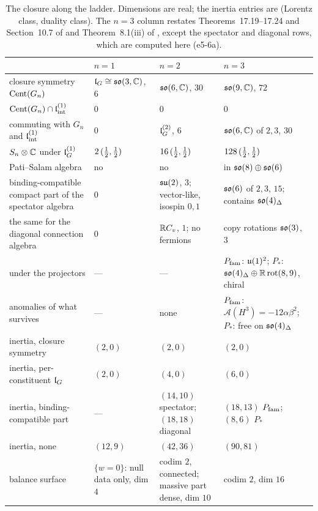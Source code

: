 \begin{table}[htbp]
\centering
\footnotesize
\begin{tabular}{@{}>{\raggedright\arraybackslash}p{3.4cm}>{\raggedright\arraybackslash}p{2.9cm}>{\raggedright\arraybackslash}p{4.3cm}>{\raggedright\arraybackslash}p{3.9cm}@{}}
\toprule
 & $n=1$ & $n=2$ & $n=3$\\
\midrule
closure symmetry $\operatorname{Cent}(G_n)$ & $\mathfrak l_G\cong\mathfrak{so}(3,\mathbb{C})$, $6$ & $\mathfrak{so}(6,\mathbb{C})$, $30$ & $\mathfrak{so}(9,\mathbb{C})$, $72$\\
$\operatorname{Cent}(G_n)\cap\mathfrak l_{\rm int}^{(1)}$ & $0$ & $0$ & $0$\\
commuting with $G_n$ and $\mathfrak l_{\rm int}^{(1)}$ & $0$ & $\mathfrak l_G^{(2)}$, $6$ & $\mathfrak{so}(6,\mathbb{C})$ of $2,3$, $30$\\
$S_n\otimes\mathbb{C}$ under $\mathfrak l_G^{(1)}$ & $2\,(\tfrac12,\tfrac12)$ & $16\,(\tfrac12,\tfrac12)$ & $128\,(\tfrac12,\tfrac12)$\\
Pati--Salam algebra & no & no & in $\mathfrak{so}(8)\oplus\mathfrak{so}(6)$\\
binding-compatible compact part of the spectator algebra & $0$ & $\mathfrak{su}(2)$, $3$; vector-like, isospin $0,1$ & $\mathfrak{so}(6)$ of $2,3$, $15$; contains $\mathfrak{so}(4)_\Delta$\\
the same for the diagonal connection algebra & $0$ & $\mathbb{R} C_v$, $1$; no fermions & copy rotations $\mathfrak{so}(3)$, $3$\\
under the projectors & --- & --- & $P_{\rm fam}$: $\mathfrak{u}(1)^2$; $P_*$: $\mathfrak{so}(4)_\Delta\oplus\mathbb{R}\,\mathrm{rot}(8,9)$, chiral\\
anomalies of what survives & --- & none & $P_{\rm fam}$: $\mathcal A(H^3)=-12\alpha\beta^2$; $P_*$: free on $\mathfrak{so}(4)_\Delta$\\
inertia, closure symmetry & $(2,0)$ & $(2,0)$ & $(2,0)$\\
inertia, per-constituent $\mathfrak l_G$ & $(2,0)$ & $(4,0)$ & $(6,0)$\\
inertia, binding-compatible part & --- & $(14,10)$ spectator; $(18,18)$ diagonal & $(18,13)$ $P_{\rm fam}$; $(8,6)$ $P_*$\\
inertia, none & $(12,9)$ & $(42,36)$ & $(90,81)$\\
balance surface & $\{w=0\}$: null data only, dim $4$ & codim $2$, connected; massive part dense, dim $10$ & codim $2$, dim $16$\\
\bottomrule
\end{tabular}
\caption{The closure along the ladder. Dimensions are real; the inertia entries are (Lorentz class, duality class). The $n=3$ column restates
Theorems~17.19--17.24 and Section~10.7 of \cite{ES17} and Theorem~8.1(iii) of \cite{RE}, except the spectator and diagonal rows, which
are computed here (e5-6a).}
\label{e5:tab:ladder}
\end{table}

